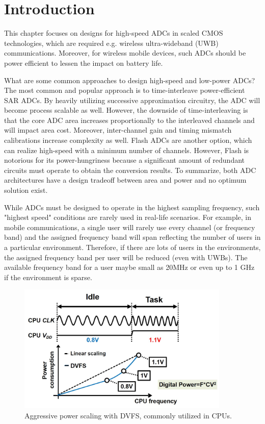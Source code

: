 \section{Introduction}

This chapter focuses on designs for high-speed ADCs in scaled CMOS technologies, which are required e.g. wireless ultra-wideband (UWB) communications.
Moreover, for wireless mobile devices, such ADCs should be power efficient to lessen the impact on battery life.

What are some common approaches to design high-speed and low-power ADCs?
The most common and popular approach is to time-interleave power-efficient SAR ADCs.
By heavily utilizing successive approximation circuitry, the ADC will become process scalable as well.
However, the downside of time-interleaving is that the core ADC area increases proportionally to the interleaved channels and will impact area cost. 
Moreover, inter-channel gain and timing mismatch calibrations increase complexity as well.
Flash ADCs are another option, which can realize high-speed with a minimum number of channels. 
However, Flash is notorious for its power-hungriness because a significant amount of redundant circuits must operate to obtain the conversion results.
To summarize, both ADC architectures have a design tradeoff between area and power and no optimum solution exist.

While ADCs must be designed to operate in the highest sampling frequency, such "highest speed" conditions are rarely used in real-life scenarios.
For example, in mobile communications, a single user will rarely use every channel (or frequency band) and the assigned frequency band will span reflecting the number of users in a particular environment.
Therefore, if there are lots of users in the environments, the assigned frequency band per user will be reduced (even with UWBs).
The available frequency band for a user maybe small as 20MHz or even up to 1 GHz if the environment is sparse.

\begin{figure}[!]
\centering
  \includegraphics[width=0.9\textwidth]{figure/chap3/dvfs.jpg}
  \caption{Aggressive power scaling with DVFS, commonly utilized in CPUs.}
  \label{fig-dvfs}
\end{figure}

